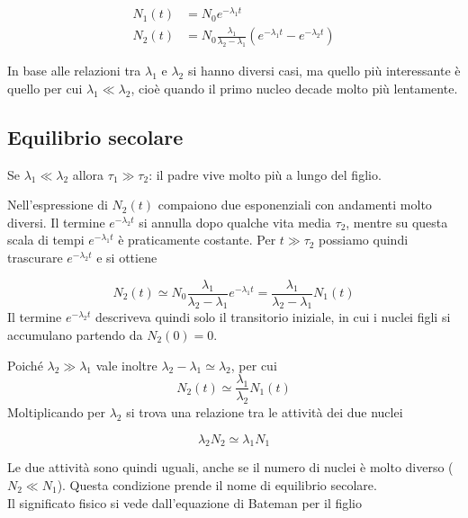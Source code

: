 \begin{tcolorbox}[colback=black!5!white, colframe=black!45!white, boxrule=0.8pt]
\begin{equation}
\begin{aligned}
N_1(t) & = N_0 e^{-\lambda_1 t} \\
N_2(t) & = N_0 \frac{\lambda_1}{\lambda_2 - \lambda_1} (e^{-\lambda_1 t} - e^{-\lambda_2 t})
\end{aligned}
\end{equation}
\end{tcolorbox}

In base alle relazioni tra $\lambda_1$ e $\lambda_2$ si hanno diversi casi, ma quello più interessante è quello per cui $\lambda_1 \ll \lambda_2$, cioè quando il primo nucleo decade molto più lentamente. 

\subsection{Equilibrio secolare}

Se $\lambda_1 \ll \lambda_2$ allora $\tau_1 \gg \tau_2$: il padre vive molto più a lungo del figlio. 

\noindent Nell'espressione di $N_2(t)$ compaiono due esponenziali con andamenti molto diversi. Il termine $e^{-\lambda_2 t}$ si annulla dopo qualche vita media $\tau_2$, mentre su questa scala di tempi $e^{-\lambda_1 t}$ è praticamente costante. Per $t \gg \tau_2$ possiamo quindi trascurare $e^{-\lambda_2 t}$ e si ottiene 

\begin{equation}
    N_2(t) \simeq N_0 \frac{\lambda_1}{\lambda_2 - \lambda_1} e^{-\lambda_1 t} = \frac{\lambda_1}{\lambda_2 - \lambda_1} N_1(t)
\end{equation}
Il termine $e^{-\lambda_2 t}$ descriveva quindi solo il transitorio iniziale, in cui i nuclei figli si accumulano partendo da $N_2(0) = 0$. 

\noindent Poiché $\lambda_2 \gg \lambda_1$ vale inoltre $\lambda_2 - \lambda_1 \simeq \lambda_2$, per cui 
%
\begin{equation}
    N_2(t) \simeq \frac{\lambda_1}{\lambda_2} N_1(t)
\end{equation}
Moltiplicando per $\lambda_2$ si trova una relazione tra le attività dei due nuclei 

\begin{tcolorbox}[colback=black!5!white, colframe=black!45!white, boxrule=0.8pt]
\begin{equation}
    \lambda_2 N_2 \simeq \lambda_1 N_1
\end{equation}
\end{tcolorbox}
Le due attività sono quindi uguali, anche se il numero di nuclei è molto diverso ($N_2 \ll N_1$). Questa condizione prende il nome di equilibrio secolare. \\
Il significato fisico si vede dall'equazione di Bateman per il figlio 

